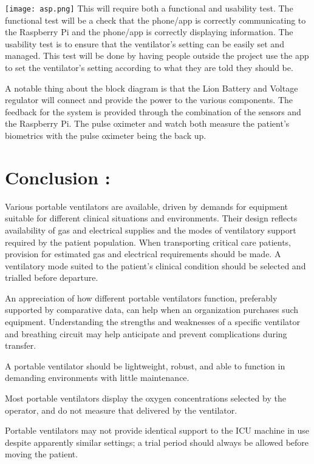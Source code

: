 \documentclass[12pt]{article}
\begin{document}
\texttt{[image: asp.png]}
This will require both a functional and usability test. The functional test will be a check
that the phone/app is correctly communicating to the Raspberry Pi and the phone/app is correctly
displaying information. The usability test is to ensure that the ventilator’s setting can be easily
set and managed. This test will be done by having people outside the project use the app to set
the ventilator’s setting according to what they are told they should be.


 A notable thing about the block diagram is that the Lion Battery and
Voltage regulator will connect and provide the power to the various components. The feedback
for the system is provided through the combination of the sensors and the Raspberry Pi. The
pulse oximeter and watch both measure the patient’s biometrics with the pulse oximeter being
the back up.

\clearpage
\section*{Conclusion : }
Various portable ventilators are available, driven by demands for equipment suitable for different clinical situations and environments. Their design reflects availability of gas and electrical supplies and the modes of ventilatory support required by the patient population. When transporting critical care patients, provision for estimated gas and electrical requirements should be made. A ventilatory mode suited to the patient’s clinical condition should be selected and trialled before departure.


An appreciation of how different portable ventilators function, preferably supported by comparative data, can help when an organization purchases such equipment. Understanding the strengths and weaknesses of a specific ventilator and breathing circuit may help anticipate and prevent complications during transfer.


A portable ventilator should be lightweight, robust, and able to function in demanding environments with little maintenance.

Most portable ventilators display the oxygen concentrations selected by the operator, and do not measure that delivered by the ventilator.

Portable ventilators may not provide identical support to the ICU machine in use despite apparently similar settings; a trial period should always be allowed before moving the patient.
\end{document}
